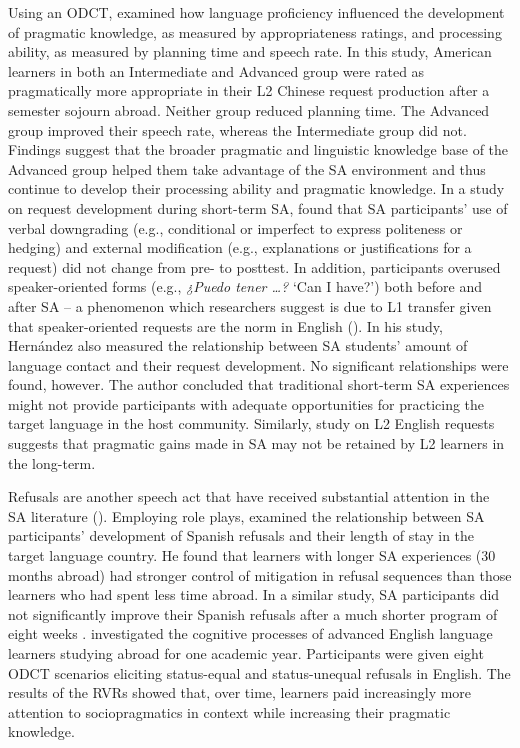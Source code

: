 \documentclass[output=paper]{langscibook}
\begin{document}
  Using an ODCT, \citet{Li2014} examined how language proficiency influenced the development of pragmatic knowledge, as measured by appropriateness ratings, and processing ability, as measured by planning time and speech rate. In this study, American learners in both an Intermediate and Advanced group were rated as pragmatically more appropriate in their L2 Chinese request production after a semester sojourn abroad. Neither group reduced planning time. The Advanced group improved their speech rate, whereas the Intermediate group did not. Findings suggest that the broader pragmatic and linguistic knowledge base of the Advanced group helped them take advantage of the SA environment and thus continue to develop their processing ability and pragmatic knowledge. In a study on request development during short-term SA, \citet{Hernández2016} found that SA participants’ use of verbal downgrading (e.g., conditional or imperfect to express politeness or hedging) and external modification (e.g., explanations or justifications for a request) did not change from pre- to posttest. In addition, participants overused speaker-oriented forms (e.g., \textit{¿Puedo tener \ldots?} ‘Can I have?’) both before and after SA -- a phenomenon which researchers suggest is due to L1 transfer given that speaker-oriented requests are the norm in English (\citealt{Félix-Brasdefer2007,MárquezReiter2000,MárquezReiter2002,Pinto2005}). In his study, Hernández also measured the relationship between SA students’ amount of language contact and their request development. No significant relationships were found, however. The author concluded that traditional short-term SA experiences might not provide participants with adequate opportunities for practicing the target language in the host community. Similarly,  study on L2 English requests suggests that pragmatic gains made in SA may not be retained by L2 learners in the long-term.

  Refusals are another speech act that have received substantial attention in the SA literature (\citealt{Barron2003,Barron2007,Félix-Brasdefer2004,Félix-Brasdefer2013,Ren2014}). Employing role plays, \citet{Félix-Brasdefer2004} examined the relationship between SA participants’ development of Spanish refusals and their length of stay in the target language country. He found that learners with longer SA experiences (30 months abroad) had stronger control of mitigation in refusal sequences than those learners who had spent less time abroad. In a similar study, SA participants did not significantly improve their Spanish refusals after a much shorter program of eight weeks \citep{Félix-Brasdefer2013}. \citet{Ren2014} investigated the cognitive processes of advanced English language learners studying abroad for one academic year. Participants were given eight ODCT scenarios eliciting status-equal and status-unequal refusals in English. The results of the RVRs showed that, over time, learners paid increasingly more attention to sociopragmatics in context while increasing their pragmatic knowledge.
\end{document}
